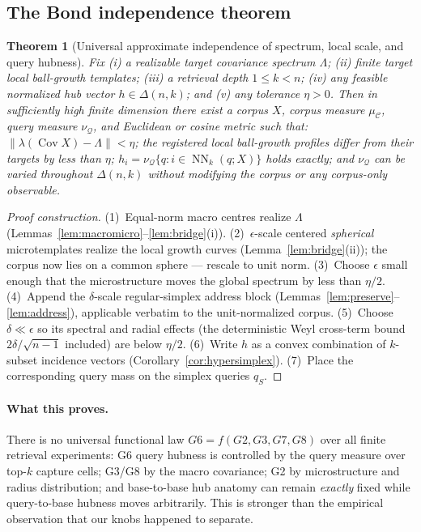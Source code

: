 \documentclass[11pt]{article}
\newcommand{\muC}{\mu_{\mathcal{C}}}
\newcommand{\nuQ}{\nu_{\mathcal{Q}}}
\newcommand{\NN}{\operatorname{NN}}
\newcommand{\Cov}{\operatorname{Cov}}
\newtheorem{theorem}{Theorem}
\begin{document}
\subsection{The Bond independence theorem}

\begin{theorem}[Universal approximate independence of spectrum, local scale,
and query hubness]\label{thm:independence}
Fix (i) a realizable target covariance spectrum $\Lambda$; (ii) finite target
local ball-growth templates; (iii) a retrieval depth $1 \le k < n$; (iv) any
feasible normalized hub vector $h \in \Delta(n,k)$; and (v) any tolerance
$\eta > 0$. Then in sufficiently high finite dimension there exist a corpus
$X$, corpus measure $\muC$, query measure $\nuQ$, and Euclidean or cosine
metric such that: $\|\lambda(\Cov X) - \Lambda\| < \eta$; the registered local
ball-growth profiles differ from their targets by less than $\eta$;
$h_i = \nuQ\{q : i \in \NN_k(q;X)\}$ holds exactly; and $\nuQ$ can be varied
throughout $\Delta(n,k)$ without modifying the corpus or any corpus-only
observable.
\end{theorem}

\begin{proof}[Proof construction]
(1)~Equal-norm macro centres realize $\Lambda$
(Lemmas~\ref{lem:macromicro}--\ref{lem:bridge}(i)).
(2)~$\epsilon$-scale centered \emph{spherical} microtemplates realize the
local growth curves (Lemma~\ref{lem:bridge}(ii)); the corpus now lies on a
common sphere --- rescale to unit norm.
(3)~Choose $\epsilon$ small enough that the microstructure moves the global
spectrum by less than $\eta/2$.
(4)~Append the $\delta$-scale regular-simplex address block
(Lemmas~\ref{lem:preserve}--\ref{lem:address}), applicable verbatim to the
unit-normalized corpus.
(5)~Choose $\delta \ll \epsilon$ so its spectral and radial effects (the
deterministic Weyl cross-term bound $2\delta/\sqrt{n-1}$ included) are below
$\eta/2$.
(6)~Write $h$ as a convex combination of $k$-subset incidence vectors
(Corollary~\ref{cor:hypersimplex}).
(7)~Place the corresponding query mass on the simplex queries $q_S$.
\end{proof}

\paragraph{What this proves.} There is no universal functional law
$G6 = f(G2, G3, G7, G8)$ over all finite retrieval experiments: G6 query
hubness is controlled by the query measure over top-$k$ capture cells; G3/G8
by the macro covariance; G2 by microstructure and radius distribution; and
base-to-base hub anatomy can remain \emph{exactly} fixed while query-to-base
hubness moves arbitrarily. This is stronger than the empirical observation
that our knobs happened to separate.
\end{document}
